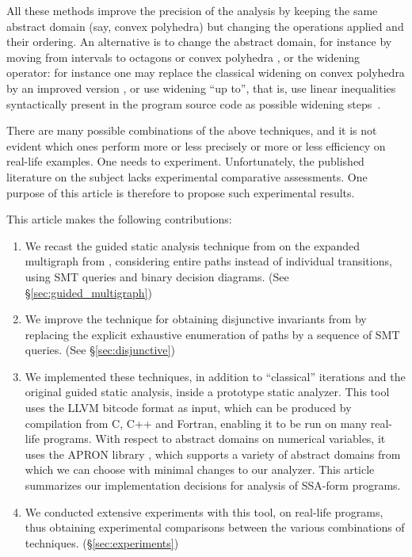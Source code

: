 \documentclass[preprint]{sigplanconf}
\begin{document}
All these methods improve the precision of the analysis by keeping the same abstract domain (say, convex polyhedra) but changing the operations applied and their ordering. An alternative is to change the abstract domain, for instance by moving from intervals to octagons or convex polyhedra \cite{DBLP:journals/lisp/Mine06,Mine_PhD}, or the widening operator: for instance one may replace the classical widening on convex polyhedra \cite{CousotHalbwachs78,Halbwachs_PhD} by an improved version \cite{BagnaraHRZ05SCP}, or use widening ``up to'', that is, use linear inequalities syntactically present in the program source code as possible widening steps~\cite{Polka:FMSD:97}.

There are many possible combinations of the above techniques, and it is not evident which ones perform more or less precisely or more or less efficiency on real-life examples. One needs to experiment.
Unfortunately, the published literature on the subject lacks experimental comparative assessments. One purpose of this article is therefore to propose such experimental results.

This article makes the following contributions:
\begin{enumerate}
\item We recast the guided static analysis technique from \citet{DBLP:conf/sas/GopanR07} on the expanded multigraph from \citet{Monniaux_Gonnord_SAS11}, considering entire paths instead of individual transitions, using SMT queries and binary decision diagrams.\label{contr:guided_multigraph} (See \S\ref{sec:guided_multigraph})
\item We improve the technique for obtaining disjunctive invariants from \citet{DBLP:conf/pldi/GulwaniZ10} by replacing the explicit exhaustive enumeration of paths by a sequence of SMT queries.\label{contr:disjunctive} (See \S\ref{sec:disjunctive})
\item We implemented these techniques, in addition to ``classical'' iterations and the original guided static analysis, inside a prototype static analyzer.
This tool uses the LLVM bitcode format \cite{Lattner:2004:LCF:977395.977673,LLVM_langref} as input, which can be produced by compilation from C, C++ and Fortran, enabling it to be run on many real-life programs.
With respect to abstract domains on numerical variables, it uses the APRON library \cite{DBLP:conf/cav/JeannetM09}, which supports a variety of abstract domains from which we can choose with minimal changes to our analyzer.
This article summarizes our implementation decisions for analysis of SSA-form programs.
\item We conducted extensive experiments with this tool, on real-life programs, thus obtaining experimental comparisons between the various combinations of techniques. (\S\ref{sec:experiments})
\end{enumerate}
\end{document}
